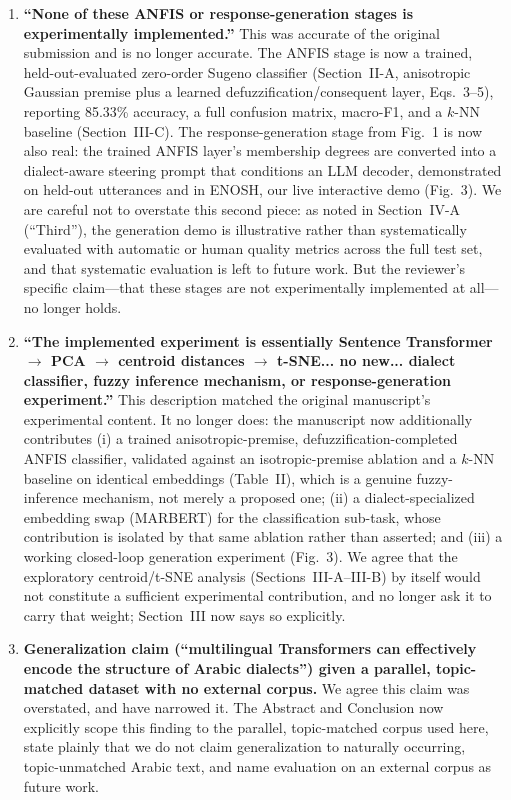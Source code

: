 \documentclass[11pt]{article}
\begin{document}
\begin{enumerate}
\item \textbf{``None of these ANFIS or response-generation stages is experimentally implemented.''} This was accurate of the original submission and is no longer accurate. The ANFIS stage is now a trained, held-out-evaluated zero-order Sugeno classifier (Section~II-A, anisotropic Gaussian premise plus a learned defuzzification/consequent layer, Eqs.~3--5), reporting 85.33\% accuracy, a full confusion matrix, macro-F1, and a $k$-NN baseline (Section~III-C). The response-generation stage from Fig.~1 is now also real: the trained ANFIS layer's membership degrees are converted into a dialect-aware steering prompt that conditions an LLM decoder, demonstrated on held-out utterances and in ENOSH, our live interactive demo (Fig.~3). We are careful not to overstate this second piece: as noted in Section~IV-A (``Third''), the generation demo is illustrative rather than systematically evaluated with automatic or human quality metrics across the full test set, and that systematic evaluation is left to future work. But the reviewer's specific claim---that these stages are not experimentally implemented at all---no longer holds.

\item \textbf{``The implemented experiment is essentially Sentence Transformer $\to$ PCA $\to$ centroid distances $\to$ t-SNE... no new... dialect classifier, fuzzy inference mechanism, or response-generation experiment.''} This description matched the original manuscript's experimental content. It no longer does: the manuscript now additionally contributes (i) a trained anisotropic-premise, defuzzification-completed ANFIS classifier, validated against an isotropic-premise ablation and a $k$-NN baseline on identical embeddings (Table~II), which is a genuine fuzzy-inference mechanism, not merely a proposed one; (ii) a dialect-specialized embedding swap (MARBERT) for the classification sub-task, whose contribution is isolated by that same ablation rather than asserted; and (iii) a working closed-loop generation experiment (Fig.~3). We agree that the exploratory centroid/t-SNE analysis (Sections~III-A--III-B) by itself would not constitute a sufficient experimental contribution, and no longer ask it to carry that weight; Section~III now says so explicitly.

\item \textbf{Generalization claim (``multilingual Transformers can effectively encode the structure of Arabic dialects'') given a parallel, topic-matched dataset with no external corpus.} We agree this claim was overstated, and have narrowed it. The Abstract and Conclusion now explicitly scope this finding to the parallel, topic-matched corpus used here, state plainly that we do not claim generalization to naturally occurring, topic-unmatched Arabic text, and name evaluation on an external corpus as future work.


\end{enumerate}
\end{document}
